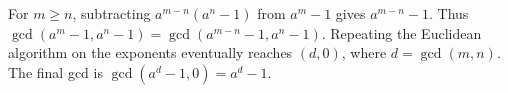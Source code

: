 For $m\ge n$, subtracting $a^{m-n}(a^n-1)$ from $a^m-1$ gives $a^{m-n}-1$. Thus $\gcd(a^m-1,a^n-1)=\gcd(a^{m-n}-1,a^n-1)$. Repeating the Euclidean algorithm on the exponents eventually reaches $(d,0)$, where $d=\gcd(m,n)$. The final gcd is $\gcd(a^d-1,0)=a^d-1$.
